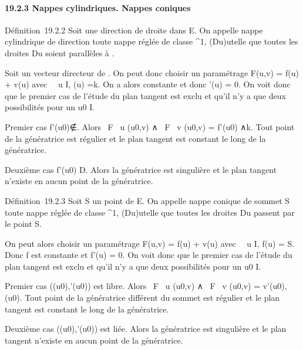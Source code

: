 \paragraph{19.2.3 Nappes cylindriques. Nappes coniques}

Définition~19.2.2 Soit \vecD une direction de droite
dans E. On appelle nappe cylindrique de direction
\vecD toute nappe réglée de classe ^1,
(Du)u\inI telle que toutes les droites Du
soient parallèles à \vecD.

Soit \veck un vecteur directeur de
\vecD. On peut donc choisir un paramétrage F(u,v) =
f(u) + v\vecg(u) avec \forall~~u \in
I, \vecg(u) =\vec k. On a alors
\vecg constante et donc \vecg'(u)
= 0. On voit donc que le premier cas de l'étude du plan tangent est
exclu et qu'il n'y a que deux possibilités pour un u0 \in I.

Premier cas
f'(u0)∉\vecD.
Alors  \partial~F \over \partial~u (u0,v) ∧ \partial~F
\over \partial~v (u0,v) = f'(u0)
∧\vec k. Tout point de la génératrice est régulier et
le plan tangent est constant le long de la génératrice.

Deuxième cas f'(u0) \in\vec D. Alors la
génératrice est singulière et le plan tangent n'existe en aucun point de
la génératrice.

Définition~19.2.3 Soit S un point de E. On appelle nappe conique de
sommet S toute nappe réglée de classe ^1,
(Du)u\inI telle que toutes les droites Du
passent par le point S.

On peut alors choisir un paramétrage F(u,v) = f(u) +
v\vecg(u) avec \forall~~u \in I, f(u)
= S. Donc f est constante et f'(u) = 0. On voit donc que le premier cas
de l'étude du plan tangent est exclu et qu'il n'y a que deux
possibilités pour un u0 \in I.

Premier cas
(\vecg(u0),\vecg'(u0))
est libre. Alors  \partial~F \over \partial~u (u0,v) ∧ \partial~F
\over \partial~v (u0,v) =
v\vecg'(u0),\vecg(u0).
Tout point de la génératrice différent du sommet est régulier et le plan
tangent est constant le long de la génératrice.

Deuxième cas
(\vecg(u0),\vecg'(u0))
est liée. Alors la génératrice est singulière et le plan tangent
n'existe en aucun point de la génératrice.

